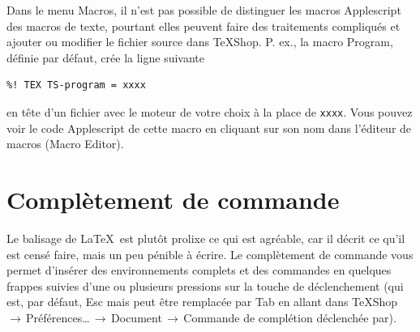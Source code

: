 \documentclass[11pt,french]{article}
\newcommand{\TS}{\textsf{\TeX Shop}}
\newcommand{\cmd}[1]{\textsf{#1}}
\newcommand{\mnu}[1]{\textsf{#1}}
\newcommand{\To}{\,\(\to\)\,}
\begin{document}
Dans le menu \mnu{Macros}, il n'est pas possible de distinguer les macros Applescript des macros de texte, pourtant elles peuvent faire des traitements compliqués et ajouter ou modifier le fichier source dans \TS{}. P. ex., la macro \mnu{Program}, définie par défaut, crée la ligne suivante
\begin{verbatim}
%! TEX TS-program = xxxx
\end{verbatim}
en tête d'un fichier avec le moteur de votre choix à la place de \texttt{xxxx}. Vous pouvez voir le code Applescript de cette macro en cliquant sur son nom dans l'éditeur de macros (\mnu{Macro Editor}). 




\section{Complètement de commande}\label{sec:CC}

Le balisage de \LaTeX\ est plutôt prolixe ce qui est agréable, car il décrit ce qu'il est censé faire, mais un peu pénible à écrire. Le complètement de commande vous permet d'insérer des environnements complets et des commandes en quelques frappes suivies d'une ou plusieurs pressions  sur la touche de déclenchement (qui est, par défaut, \cmd{Esc} mais peut être remplacée par \cmd{Tab} en allant dans \mnu{TeXShop}\To\mnu{Préférences…}\To\mnu{Document}\To\mnu{Commande de complétion déclenchée par}).
\end{document}
